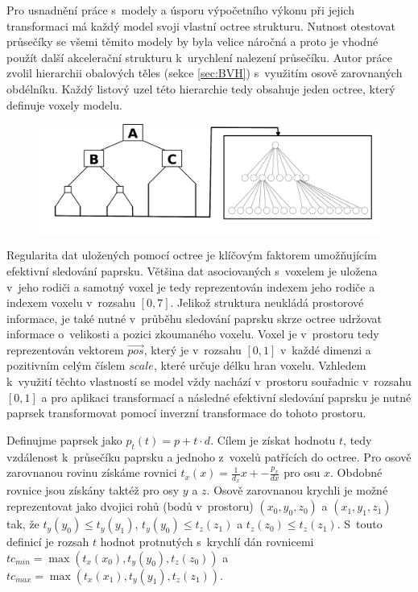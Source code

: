 Pro usnadnění práce s~modely a úsporu výpočetního výkonu při jejich transformaci má každý model svoji vlastní octree strukturu. Nutnost otestovat průsečíky se všemi těmito modely by byla velice náročná a proto je vhodné použít další akcelerační strukturu k~urychlení nalezení průsečíku. Autor práce zvolil hierarchii obalových těles (sekce \ref{sec:BVH}) s~využitím osově zarovnaných obdélníku. Každý listový uzel této hierarchie tedy obsahuje jeden octree, který definuje voxely modelu. 

\begin{figure}[H]
	\centering
	\includegraphics[scale=1]{images/bvh_octree.png}
	\captionsetup{justification=centering}
	\label{fig:scene_bvh_repr}
\end{figure}

Regularita dat uložených pomocí octree je klíčovým faktorem umožňujícím efektivní sledování paprsku. Většina dat asociovaných s~voxelem je uložena v~jeho rodiči a samotný voxel je tedy reprezentován indexem jeho rodiče a indexem voxelu v~rozsahu $[0, 7]$. Jelikož struktura neukládá prostorové informace, je také nutné v~průběhu sledování paprsku skrze octree udržovat informace o~velikosti a pozici zkoumaného voxelu. Voxel je v~prostoru tedy reprezentován vektorem $\vec{pos}$, který je v~rozsahu $[0, 1]$ v~každé dimenzi a pozitivním celým číslem $scale$, které určuje délku hran voxelu. Vzhledem k~využití těchto vlastností se model vždy nachází v~prostoru souřadnic v~rozsahu $[0, 1]$ a pro aplikaci transformací a následné efektivní sledování paprsku je nutné paprsek transformovat pomocí inverzní transformace do tohoto prostoru.

Definujme paprsek jako $p_t(t) = p + t\cdot d$. Cílem je získat hodnotu $t$, tedy vzdálenost k~průsečíku paprsku a jednoho z~voxelů patřících do octree. Pro osově zarovnanou rovinu získáme rovnici $t_x(x) = \frac{1}{d_x}x + -\frac{p_x}{dx}$ pro osu $x$. Obdobné rovnice jsou získány taktéž pro osy $y$ a $z$. Osově zarovnanou krychli je možné reprezentovat jako dvojici rohů (bodů v~prostoru) $(x_0, y_0, z_0)$ a $(x_1, y_1, z_1)$ tak, že $t_y(y_0) \leq t_y(y_1)$, $t_y(y_0) \leq t_z(z_1)$ a $t_z(z_0) \leq t_z(z_1)$. S~touto definicí je rozsah $t$ hodnot protnutých s~krychlí dán rovnicemi $tc_{min} = \max(t_x(x_0), t_y(y_0), t_z(z_0))$ a $tc_{max} = \max(t_x(x_1), t_y(y_1), t_z(z_1))$.

